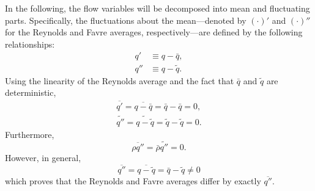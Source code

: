In the following, the flow variables will be decomposed into mean and
fluctuating parts.  Specifically, the fluctuations about the
mean---denoted by $(\cdot)'$ and $(\cdot)''$ for the Reynolds and
Favre averages, respectively---are defined by the following
relationships:
%
\begin{align}
q' &\equiv q - \bar{q}, \\
q'' &\equiv q - \tilde{q}.
\end{align}
%
Using the linearity of the Reynolds average and the fact that
$\bar{q}$ and $\tilde{q}$ are deterministic,
%
\begin{gather}
\overline{q'} = \overline{q - \bar{q}} = \bar{q} - \bar{q} =  0, \\
\widetilde{q''} = \widetilde{q - \tilde{q}} = \tilde{q} - \tilde{q} = 0.
\end{gather}
%
Furthermore,
%
\begin{equation}
\overline{\rho q''} = \bar{\rho} \widetilde{q''} = 0.
\end{equation}
%
However, in general,
%
\begin{equation}
\overline{q''} = \overline{q - \tilde{q}} = \bar{q} - \tilde{q} \neq 0
\end{equation}
which proves that
the Reynolds and Favre averages differ by exactly $\overline{q''}$.

